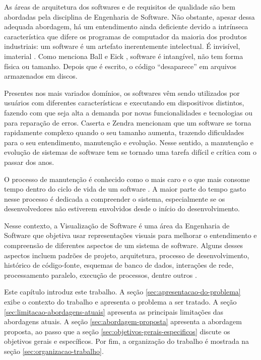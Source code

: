 As áreas de arquitetura dos softwares e de requisitos de qualidade são bem abordadas pela disciplina de Engenharia de Software. Não obstante, apesar dessa adequada abordagem, há um entendimento ainda deficiente devido a intrínseca característica que difere os programas de computador da maioria dos produtos industriais: um software é um artefato inerentemente intelectual. É invisível, imaterial \cite{Steinbruckner2010}. Como menciona Ball e Eick \cite{Ball1996}, software é intangível, não tem forma física ou tamanho. Depois que é escrito, o código “desaparece” em arquivos armazenados em discos.

Presentes nos mais variados domínios, os softwares vêm sendo utilizados por usuários com diferentes características e executando em dispositivos distintos, fazendo com que seja alta a demanda por novas funcionalidades e tecnologias ou para reparação de erros. Caserta e Zendra \cite{Caserta2011} mencionam que um software se torna rapidamente complexo quando o seu tamanho aumenta, trazendo dificuldades para o seu entendimento, manutenção e evolução. Nesse sentido, a manutenção e evolução de sistemas de software tem se tornado uma tarefa difícil e crítica com o passar dos anos.

O processo de manutenção é conhecido como o mais caro e o que mais consome tempo dentro do ciclo de vida de um software \cite{Abreu1995}. A maior parte do tempo gasto nesse processo é dedicada a compreender o sistema, especialmente se os desenvolvedores não estiverem envolvidos desde o início do desenvolvimento.

Nesse contexto, a Visualização de Software é uma área da Engenharia de Software que objetiva usar representações visuais para melhorar o entendimento e compreensão de diferentes aspectos de um sistema de software. Alguns desses aspectos incluem padrões de projeto, arquitetura, processo de desenvolvimento, histórico de código-fonte, esquemas de banco de dados, interações de rede, processamento paralelo, execução de processos, dentre outros \cite{Ghanam2008}.

Este capítulo introduz este trabalho. A seção \ref{sec:apresentacao-do-problema} exibe o contexto do trabalho e apresenta o problema a ser tratado. A seção \ref{sec:limitacao-abordagens-atuais} apresenta as principais limitações das abordagens atuais. A seção \ref{sec:abordagem-proposta} apresenta a abordagem proposta, ao passo que a seção \ref{sec:objetivos-gerais-especificos} discute os objetivos gerais e específicos. Por fim, a organização do trabalho é mostrada na seção \ref{sec:organizacao-trabalho}.

